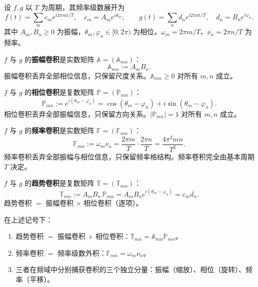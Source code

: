 设 $f, g$ 以 $T$ 为周期，其频率级数展开为
\[
f(t) = \sum_{m} c_m e^{i 2\pi m t/T}, \quad c_m = A_m e^{i\theta_m}; \qquad
g(t) = \sum_{n} d_n e^{i 2\pi n t/T}, \quad d_n = B_n e^{i\varphi_n}.
\]
其中 $A_m,B_n\ge 0$ 为振幅，$\theta_m,\varphi_n\in[0,2\pi)$ 为相位，$\omega_m=2\pi m/T$、$\nu_n=2\pi n/T$ 为频率。

\begin{definition}[振幅卷积]\label{def:amplitude_convolution}
$f$ 与 $g$ 的\textbf{振幅卷积}是实数矩阵 $\mathbb{A} = (\mathbb{A}_{mn})$：
\[
\mathbb{A}_{mn} := A_m B_n.
\]
振幅卷积丢弃全部相位信息，只保留尺度关系。$\mathbb{A}_{mn} \ge 0$ 对所有 $m, n$ 成立。
\end{definition}

\begin{definition}[相位卷积]\label{def:phase_convolution}
$f$ 与 $g$ 的\textbf{相位卷积}是复数矩阵 $\mathbb{P} = (\mathbb{P}_{mn})$：
\[
\mathbb{P}_{mn} := e^{i(\theta_m - \varphi_n)} = \cos(\theta_m - \varphi_n) + i\sin(\theta_m - \varphi_n).
\]
相位卷积丢弃全部振幅信息，只保留方向关系。$|\mathbb{P}_{mn}| = 1$ 对所有 $m, n$ 成立。
\end{definition}

\begin{definition}[频率卷积]\label{def:frequency_convolution}
$f$ 与 $g$ 的\textbf{频率卷积}是实数矩阵 $\mathbb{F} = (\mathbb{F}_{mn})$：
\[
\mathbb{F}_{mn} := \omega_m \nu_n = \frac{2\pi m}{T} \cdot \frac{2\pi n}{T} = \frac{4\pi^2 mn}{T^2}.
\]
频率卷积丢弃全部振幅与相位信息，只保留频率格结构。频率卷积完全由基本周期 $T$ 决定。
\end{definition}

\begin{definition}[趋势卷积]\label{def:tendency_convolution}
$f$ 与 $g$ 的\textbf{趋势卷积}是复数矩阵 $\mathbb{T} = (\mathbb{T}_{mn})$：
\[
\mathbb{T}_{mn} := A_m B_n \, \mathbb{P}_{mn} = A_m B_n e^{i(\theta_m - \varphi_n)} = c_m \overline{d_n}.
\]
趋势卷积 $=$ 振幅卷积 $\times$ 相位卷积（逐项）。
\end{definition}

\begin{proposition}[三类卷积与趋势卷积的关系]\label{prop:three_convolutions_relation}
在上述记号下：
\begin{enumerate}[label=(\roman*)]
    \item 趋势卷积 $=$ 振幅卷积 $\times$ 相位卷积：$\mathbb{T}_{mn} = \mathbb{A}_{mn} \mathbb{P}_{mn}$。
    \item 频率卷积 $=$ 频率级数外积：$\mathbb{F}_{mn} = \omega_m \nu_n$。
    \item 三者在频域中分别捕获卷积的三个独立分量：振幅（缩放）、相位（旋转）、频率（平移）。
\end{enumerate}
\end{proposition}

